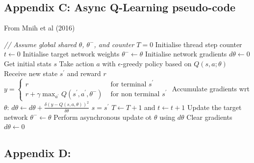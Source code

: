 \documentclass{article}
\begin{document}
\subsection*{Appendix C: Async Q-Learning pseudo-code}
\label{async_q_pseudo}

From Mnih et al (2016)

\begin{algorithmic}[1]
\State \textit{// Assume global shared  $\theta$, $\theta^{-}$, and counter $T = 0$}
\State Initialise thread step counter $t \gets 0$
\State Initialise target network weights $\theta^{-} \gets \theta$
\State Initialise network gradients $d\theta \gets 0$
\State Get initial stats $s$
    \State Take action $a$ with $\epsilon$-greedy policy based on $Q\left(s,a;\theta\right)$
    \State Receive new state $s^{\prime}$ and reward $r$
    \State $y= \begin{cases}r & \text { for terminal } s^{\prime} \\ r + \gamma \max _{a^{\prime}} Q\left(s^{\prime}, a^{\prime}, \theta^{-}\right) & \text { for non terminal } s^{\prime}\end{cases}$
    \State Accumulate gradients wrt $\theta$: $d\theta \gets d\theta + \frac{\delta\left( y-Q\left(s, a, \theta\right)\right)^{2}}{\delta\theta}$
    \State $s = s^{\prime}$
    \State $T \gets T + 1$ and $t \gets t + 1$
        \State Update the target network $\theta^{-} \gets \theta$
    \EndIf
        \State Perform asynchronous update ot $\theta$ using $d\theta$
        \State Clear gradients $d\theta \gets 0$
    \EndIf
\EndWhile

\end{algorithmic}


\subsection*{Appendix D: }
\end{document}
